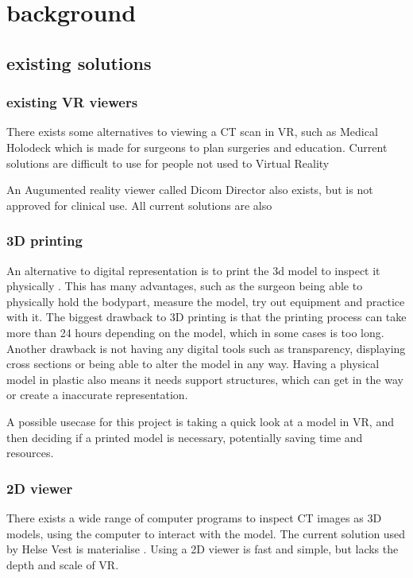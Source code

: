 \documentclass[11pt]{article}
\begin{document}
\section{ background } 

\subsection{ existing solutions}

\subsubsection{existing VR viewers}

There exists some alternatives to viewing a CT scan in VR, such as Medical Holodeck \cite{holodeck} which is made for surgeons to plan surgeries and education. Current solutions are difficult to use for people not used to Virtual Reality

An Augumented reality viewer called Dicom Director also exists, but is not approved for clinical use. \cite{dicomdirector} All current solutions are also 


\subsubsection { 3D printing }

An alternative to digital representation is to print the 3d model to inspect it physically \cite{virtualplanningand3dprinting}. This has many advantages, such as the surgeon being able to physically hold the bodypart, measure the model, try out equipment and practice with it.
The biggest drawback to 3D printing is that the printing process can take more than 24 hours depending on the model, which in some cases is too long. Another drawback is not having any digital tools such as transparency, displaying cross sections or being able to alter the model in any way. Having a physical model in plastic also means it needs support structures, which can get in the way or create a inaccurate representation.

A possible usecase for this project is taking a quick look at a model in VR, and then deciding if a printed model is necessary, potentially saving time and resources.

\subsubsection {2D viewer}

There exists a wide range of computer programs to inspect CT images as 3D models, using the computer to interact with the model.
The current solution used by Helse Vest is materialise \cite{materialise}. Using a 2D viewer is fast and simple, but lacks the depth and scale of VR.
\end{document}
